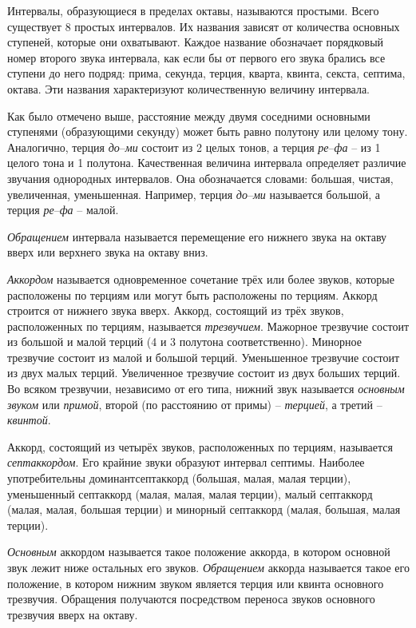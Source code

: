 Интервалы, образующиеся в пределах октавы, называются простыми. Всего существует
8 простых интервалов. Их названия зависят от количества основных ступеней,
которые они охватывают. Каждое название обозначает порядковый номер второго
звука интервала, как если бы от первого его звука брались все ступени до него
подряд: прима, секунда, терция, кварта, квинта, секста, септима, октава. Эти
названия характеризуют количественную величину интервала.

Как было отмечено выше, расстояние между двумя соседними основными ступенями
(образующими секунду) может быть равно полутону или целому тону. Аналогично,
терция \emph{до}--\emph{ми} состоит из 2 целых тонов, а терция
\emph{ре}--\emph{фа} -- из 1 целого тона и 1 полутона. Качественная величина
интервала определяет различие звучания однородных интервалов. Она обозначается
словами: большая, чистая, увеличенная, уменьшенная. Например, терция
\emph{до}--\emph{ми} называется большой, а терция \emph{ре}--\emph{фа} -- малой.

\emph{Обращением} интервала называется перемещение его нижнего звука на октаву
вверх или верхнего звука на октаву вниз.

\emph{Аккордом} называется одновременное сочетание трёх или более звуков,
которые расположены по терциям или могут быть расположены по терциям. Аккорд
строится от нижнего звука вверх. Аккорд, состоящий из трёх звуков, расположенных
по терциям, называется \emph{трезвучием}. Мажорное трезвучие состоит из большой
и малой терций (4 и 3 полутона соответственно). Минорное трезвучие состоит из
малой и большой терций. Уменьшенное трезвучие состоит из двух малых терций.
Увеличенное трезвучие состоит из двух больших терций. Во всяком трезвучии,
независимо от его типа, нижний звук называется \emph{основным звуком} или
\emph{примой}, второй (по расстоянию от примы) -- \emph{терцией}, а третий --
\emph{квинтой}.

Аккорд, состоящий из четырёх звуков, расположенных по терциям, называется
\emph{септаккордом}. Его крайние звуки образуют интервал септимы. Наиболее
употребительны доминантсептаккорд (большая, малая, малая терции), уменьшенный
септаккорд (малая, малая, малая терции), малый септаккорд (малая, малая,
большая терции) и минорный септаккорд (малая, большая, малая терции).

\emph{Основным} аккордом называется такое положение аккорда, в котором основной
звук лежит ниже остальных его звуков. \emph{Обращением} аккорда называется такое
его положение, в котором нижним звуком является терция или квинта основного
трезвучия. Обращения получаются посредством переноса звуков основного трезвучия
вверх на октаву.


